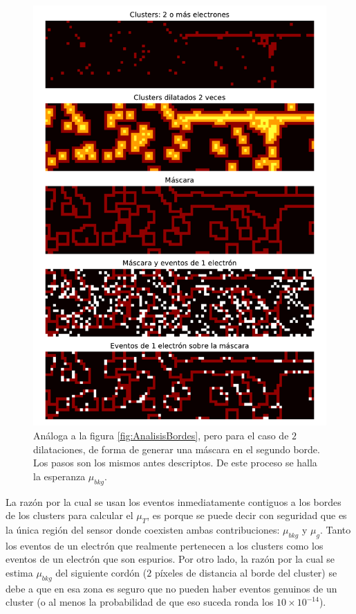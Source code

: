 \begin{figure}[h]
    \centering
    \includegraphics[scale=0.7]{Figs/analisis_bordesx2.pdf}
    \caption{\footnotesize{Análoga a la figura \ref{fig:AnalisisBordes}, pero para el caso de $2$ dilataciones, de forma de generar una máscara en el segundo borde. Los pasos son los mismos antes descriptos. De este proceso se halla la esperanza $\mu_{bkg}$.}}
    \label{fig:AnalisisBordesx2}
\end{figure}
La razón por la cual se usan los eventos inmediatamente contiguos a los bordes de los clusters para calcular el $\mu_{T}$, es porque se puede decir con seguridad que es la única región del sensor donde coexisten ambas contribuciones: $\mu_{bkg}$ y $\mu_{g}$. Tanto los eventos de un electrón que realmente pertenecen a los clusters como los eventos de un electrón que son espurios. Por otro lado, la razón por la cual se estima $\mu_{bkg}$ del siguiente cordón ($2$ píxeles de distancia al borde del cluster) se debe a que en esa zona es seguro que no pueden haber eventos genuinos de un cluster (o al menos la probabilidad de que eso suceda ronda los $10\times 10^{-14}$).\\
